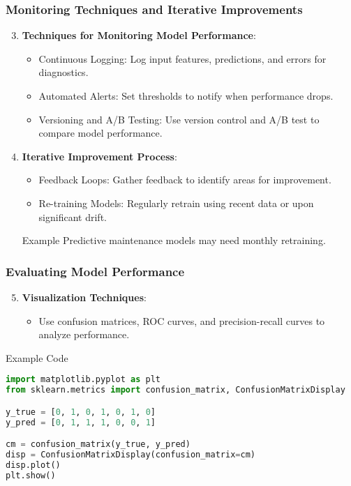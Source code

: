 \documentclass[aspectratio=169]{beamer}
\begin{document}
\begin{frame}[fragile]
    \frametitle{Monitoring Techniques and Iterative Improvements}
    \begin{enumerate}
        \setcounter{enumi}{2}
        \item \textbf{Techniques for Monitoring Model Performance}:
        \begin{itemize}
            \item Continuous Logging: Log input features, predictions, and errors for diagnostics.
            \item Automated Alerts: Set thresholds to notify when performance drops.
            \item Versioning and A/B Testing: Use version control and A/B test to compare model performance.
        \end{itemize}

        \item \textbf{Iterative Improvement Process}:
        \begin{itemize}
            \item Feedback Loops: Gather feedback to identify areas for improvement.
            \item Re-training Models: Regularly retrain using recent data or upon significant drift.
        \end{itemize}
        \begin{exampleblock}{Example}
            Predictive maintenance models may need monthly retraining.
        \end{exampleblock}
    \end{enumerate}
\end{frame}

\begin{frame}[fragile]
    \frametitle{Evaluating Model Performance}
    \begin{enumerate}
        \setcounter{enumi}{4}
        \item \textbf{Visualization Techniques}:
        \begin{itemize}
            \item Use confusion matrices, ROC curves, and precision-recall curves to analyze performance.
        \end{itemize}
    \end{enumerate}
    \begin{block}{Example Code}
        \begin{lstlisting}[language=Python]
import matplotlib.pyplot as plt
from sklearn.metrics import confusion_matrix, ConfusionMatrixDisplay

y_true = [0, 1, 0, 1, 0, 1, 0]
y_pred = [0, 1, 1, 1, 0, 0, 1]

cm = confusion_matrix(y_true, y_pred)
disp = ConfusionMatrixDisplay(confusion_matrix=cm)
disp.plot()
plt.show()
        \end{lstlisting}
    \end{block}
\end{frame}
\end{document}
